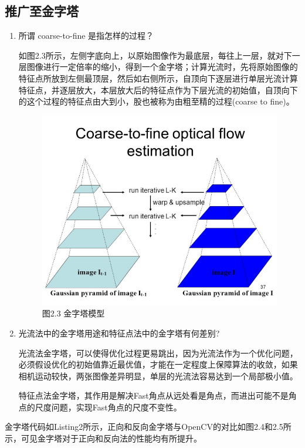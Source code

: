 \documentclass[40pt,a4paper，UTF8]{ctexart}
\numberwithin{equation}{section}
\begin{document}
\subsection{推广至金字塔}
\begin{enumerate}
\item 所谓 coarse-to-fine 是指怎样的过程？

如图2.3所示，左侧字底向上，以原始图像作为最底层，每往上一层，就对下一层图像进行一定倍率的缩小，得到一个金字塔；计算光流时，先将原始图像的特征点所放到左侧最顶层，然后如右侧所示，自顶向下逐层进行单层光流计算特征点，并逐层放大，本层放大后的特征点作为下层光流的初始值，自顶向下的这个过程的特征点由大到小，股也被称为由粗至精的过程(coarse to fine)。
\begin{figure}[H]
\centering
\includegraphics[scale=0.5]{ch6_2_5.png} {\\图2.3 金字塔模型}
\end{figure}

\item 光流法中的金字塔用途和特征点法中的金字塔有何差别?

光流法金字塔，可以使得优化过程更易跳出，因为光流法作为一个优化问题，必须假设优化的初始值靠近最优值，才能在一定程度上保障算法的收敛，如果相机运动较快，两张图像差异明显，单层的光流法容易达到一个局部极小值。

特征点法金字塔，其作用是解决Fast角点从远处看是角点，而进出可能不是角点的尺度问题，实现Fast角点的尺度不变性。
\end{enumerate}


金字塔代码如Listing2所示，正向和反向金字塔与OpenCV的对比如图2.4和2.5所示，可见金字塔对于正向和反向法的性能均有所提升。
\end{document}
